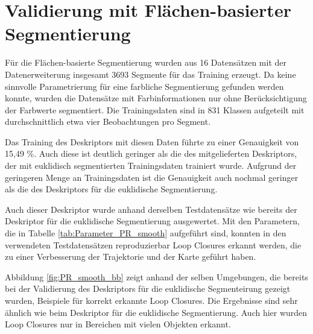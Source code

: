 \section[Validierung mit Flächen-basierter Segmentierung (Kopp, Schmelzer)]{Validierung mit Flächen-basierter Segmentierung}

Für die Flächen-basierte Segmentierung wurden aus 16 Datensätzen mit der Datenerweiterung insgesamt 3693 Segmente für das Training erzeugt. Da keine sinnvolle Parametrierung für eine farbliche Segmentierung gefunden werden konnte, wurden die Datensätze mit Farbinformationen nur ohne Berücksichtigung der Farbwerte segmentiert. Die Trainingsdaten sind in 831 Klassen aufgeteilt mit durchschnittlich etwa vier Beobachtungen pro Segment. 

Das Training des Deskriptors mit diesen Daten führte zu einer Genauigkeit von 15,49 \%. Auch diese ist deutlich geringer als die des mitgelieferten Deskriptors, der mit euklidisch segmentierten Trainingsdaten trainiert wurde. Aufgrund der geringeren Menge an Trainingsdaten ist die Genauigkeit auch nochmal geringer als die des Deskriptors für die euklidische Segmentierung. 

Auch dieser Deskriptor wurde anhand derselben Testdatensätze wie bereits der Deskriptor für die euklidische Segmentierung ausgewertet. Mit den Parametern, die in Tabelle \ref{tab:Parameter_PR_smooth} aufgeführt sind, konnten in den verwendeten Testdatensätzen reproduzierbar Loop Closures erkannt werden, die zu einer Verbesserung der Trajektorie und der Karte geführt haben. 

Abbildung \ref{fig:PR_smooth_bb} zeigt anhand der selben Umgebungen, die bereits bei der Validierung des Deskriptors für die euklidische Segmenteirung gezeigt wurden, Beispiele für korrekt erkannte Loop Closures. Die Ergebnisse sind sehr ähnlich wie beim Deskriptor für die euklidische Segmentierung. Auch hier wurden Loop Closures nur in Bereichen mit vielen Objekten erkannt. 



